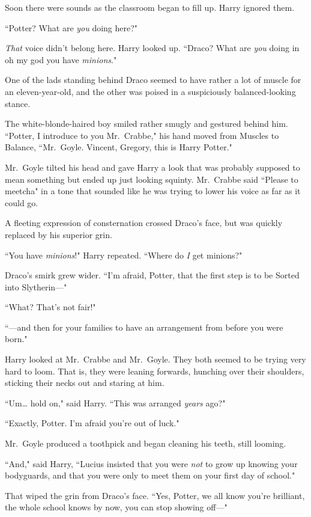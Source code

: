 Soon there were sounds as the classroom began to fill up. Harry ignored them.

``Potter? What are \emph{you} doing here?"

\emph{That} voice didn't belong here. Harry looked up. ``Draco? What are \emph{you} doing in oh my god you have \emph{minions}."

One of the lads standing behind Draco seemed to have rather a lot of muscle for an eleven-year-old, and the other was poised in a suspiciously balanced-looking stance.

The white-blonde-haired boy smiled rather smugly and gestured behind him. ``Potter, I introduce to you Mr.~Crabbe," his hand moved from Muscles to Balance, ``Mr.~Goyle. Vincent, Gregory, this is Harry Potter."

Mr.~Goyle tilted his head and gave Harry a look that was probably supposed to mean something but ended up just looking squinty. Mr.~Crabbe said ``Please to meetcha" in a tone that sounded like he was trying to lower his voice as far as it could go.

A fleeting expression of consternation crossed Draco's face, but was quickly replaced by his superior grin.

``You have \emph{minions}!" Harry repeated. ``Where do \emph{I} get minions?"

Draco's smirk grew wider. ``I'm afraid, Potter, that the first step is to be Sorted into Slytherin—"

``What? That's not fair!"

``—and then for your families to have an arrangement from before you were born."

Harry looked at Mr.~Crabbe and Mr.~Goyle. They both seemed to be trying very hard to loom. That is, they were leaning forwards, hunching over their shoulders, sticking their necks out and staring at him.

``Um{\ldots} hold on," said Harry. ``This was arranged \emph{years} ago?"

``Exactly, Potter. I'm afraid you're out of luck."

Mr.~Goyle produced a toothpick and began cleaning his teeth, still looming.

``And," said Harry, ``Lucius insisted that you were \emph{not} to grow up knowing your bodyguards, and that you were only to meet them on your first day of school."

That wiped the grin from Draco's face. ``Yes, Potter, we all know you're brilliant, the whole school knows by now, you can stop showing off—"

